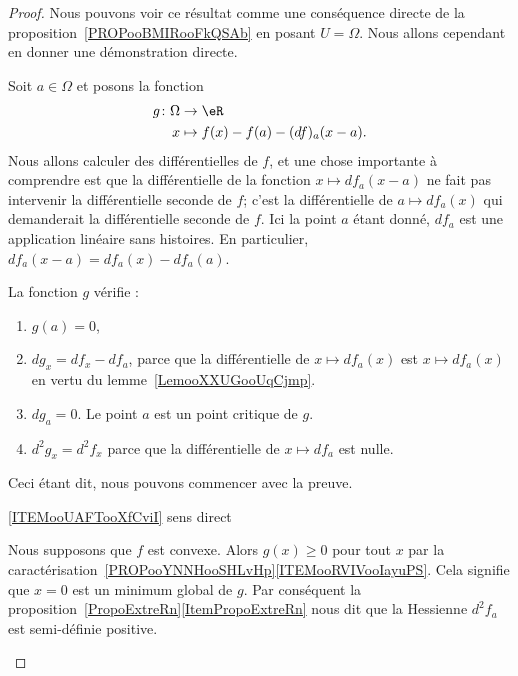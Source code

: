 \begin{proof}
    Nous pouvons voir ce résultat comme une conséquence directe de la proposition~\ref{PROPooBMIRooFkQSAb} en posant \( U=\Omega\). Nous allons cependant en donner une démonstration directe.

    Soit \( a\in \Omega\) et posons la fonction
    \begin{equation}
        \begin{aligned}
            g\colon \Omega  & \to \eR             \\
                      x     & \mapsto f(x)-f(a)-(df)_a(x-a).
        \end{aligned}
    \end{equation}
    Nous allons calculer des différentielles de \( f\), et une chose importante à comprendre est que la différentielle de la fonction \( x\mapsto df_a(x-a)\) ne fait pas intervenir la différentielle seconde de \( f\); c'est la différentielle de \( a\mapsto df_a(x)\) qui demanderait la différentielle seconde de \( f\). Ici la point \( a\) étant donné, \( df_a\) est une application linéaire sans histoires. En particulier, \( df_a(x-a)=df_a(x)-df_a(a)\).

    La fonction \( g\) vérifie :
    \begin{enumerate}
        \item
            \( g(a)=0\),
        \item
            \( dg_x=df_x-df_a\), parce que la différentielle de \( x\mapsto df_a(x)\) est \( x\mapsto df_a(x)\) en vertu du lemme~\ref{LemooXXUGooUqCjmp}.
        \item
            \( dg_a=0\). Le point \( a\) est un point critique de \( g\).
        \item
            \( d^2g_x=d^2f_x\) parce que la différentielle de \( x\mapsto df_a\) est nulle.
    \end{enumerate}
    Ceci étant dit, nous pouvons commencer avec la preuve.
    \begin{subproof}
        \item[\ref{ITEMooUAFTooXfCviI} sens direct]

            Nous supposons que \( f\) est convexe. Alors \( g(x)\geq 0\) pour tout \( x\) par la caractérisation~\ref{PROPooYNNHooSHLvHp}\ref{ITEMooRVIVooIayuPS}. Cela signifie que \( x=0\) est un minimum global de \( g\). Par conséquent la proposition~\ref{PropoExtreRn}\ref{ItemPropoExtreRn} nous dit que la Hessienne \( d^2f_a\) est semi-définie positive.


\end{subproof}
\end{proof}
